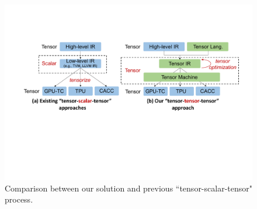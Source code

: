 \begin{figure}[t]
  \centering
  \vspace{-5pt}
\includegraphics[width=1.0\columnwidth]{figures/intro-comp.pdf}
\vspace{-15pt}
\caption{\footnotesize Comparison between our solution and previous ``tensor-scalar-tensor" process.}
\label{fig:intro-comp}
\vspace{-10pt}
\end{figure}




